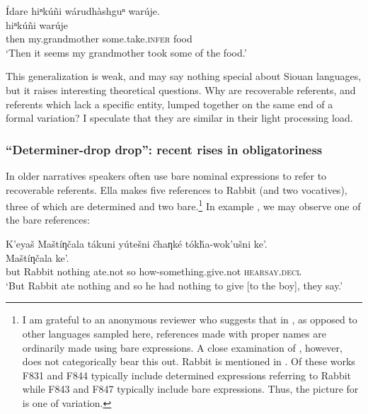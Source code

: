 \documentclass[output=paper]{LSP/langsci}
\begin{document}
\ea\label{wansigechemidrop}
Ídare hiⁿkúñi wárudhàshguⁿ warúje.\rmfnm\\
\gll	{} 		hiⁿkúñi 					warúje\\
	then 				my.grandmother 			some.take.\textsc{infer}	food\\
\glt	`Then it seems my grandmother took some of the food.'
\z

This generalization is weak, and may say nothing special about Siouan languages, but it raises interesting theoretical questions. Why are recoverable referents, and referents which lack a specific entity, lumped together on the same end of a formal variation? I speculate that they are similar in their light processing load.

\subsubsection{“Determiner-drop drop”: recent rises in obligatoriness}\label{determinerdropdrop}

	In older  narratives speakers often use bare nominal expressions to refer to recoverable referents. Ella \citet[F831]{Deloria1932} makes five references to Rabbit (and two vocatives), three of which are determined and two bare.\footnote{I am grateful to an anonymous reviewer who suggests that in , as opposed to other languages sampled here, references made with proper names are ordinarily made using bare expressions. A close examination of \citet{Deloria1932}, however, does not categorically bear this out. Rabbit is mentioned in \citet[F831, F843, F844 and F847]{Deloria1932}. Of these works F831 and F844 typically include determined expressions referring to Rabbit while F843 and F847 typically include bare expressions. Thus, the picture for  is one of variation.} In example , we may observe one of the bare references:
	
\ea\label{deloriadrop}
	K’eyaš Maštíƞčala tákuni yútešni čhaƞké tókȟa-wok’ušni ke’.\rmfnm\\
\gll	{} 	Maštíƞčala 	 		  			ke’. \\
	but 			Rabbit		nothing	 	ate.not	 	 so 			 how-something.give.not 				\textsc{hearsay.decl}\\
\glt	`But Rabbit ate nothing and so he had nothing to give [to the boy], they say.'
\z
\end{document}
